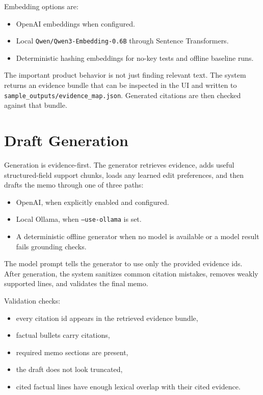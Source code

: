 \documentclass[11pt]{article}
\newcommand{\code}[1]{\texttt{#1}}
\begin{document}
Embedding options are:

\begin{itemize}
  \item OpenAI embeddings when configured.
  \item Local \code{Qwen/Qwen3-Embedding-0.6B} through Sentence Transformers.
  \item Deterministic hashing embeddings for no-key tests and offline baseline runs.
\end{itemize}

The important product behavior is not just finding relevant text. The system returns an evidence bundle that can be inspected in the UI and written to \code{sample\_outputs/evidence\_map.json}. Generated citations are then checked against that bundle.

\section{Draft Generation}

Generation is evidence-first. The generator retrieves evidence, adds useful structured-field support chunks, loads any learned edit preferences, and then drafts the memo through one of three paths:

\begin{itemize}
  \item OpenAI, when explicitly enabled and configured.
  \item Local Ollama, when \code{--use-ollama} is set.
  \item A deterministic offline generator when no model is available or a model result fails grounding checks.
\end{itemize}

The model prompt tells the generator to use only the provided evidence ids. After generation, the system sanitizes common citation mistakes, removes weakly supported lines, and validates the final memo.

Validation checks:

\begin{itemize}
  \item every citation id appears in the retrieved evidence bundle,
  \item factual bullets carry citations,
  \item required memo sections are present,
  \item the draft does not look truncated,
  \item cited factual lines have enough lexical overlap with their cited evidence.
\end{itemize}
\end{document}
